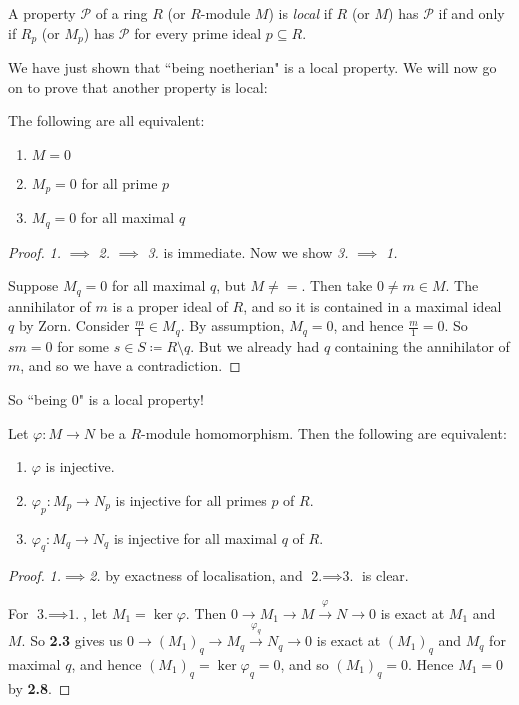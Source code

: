 \documentclass[10pt,a4paper]{article}
\begin{document}
\begin{definition}
  A property $\mathscr{P}$ of a ring $R$ (or $R$-module $M$) is \emph{local} if $R$ (or $M$) has $\mathscr{P}$ if and only if $R_p$ (or $M_p$) has $\mathscr{P}$ for every prime ideal $p \subseteq R$.
\end{definition}
We have just shown that ``being noetherian" is a local property. We will now go on to prove that another property is local:
\begin{lemma}
  The following are all equivalent:
  \begin{enumerate}
    \item $M=0$
    \item $M_p = 0$ for all prime $p$
    \item $M_q = 0$ for all maximal $q$
  \end{enumerate}
\end{lemma}
\begin{proof}
  \textit{1.} $\implies$ \textit{2.} $\implies$ \textit{3.} is immediate. Now we show \textit{3.} $\implies$ \textit{1.}

  Suppose $M_q = 0$ for all maximal $q$, but $M \neq =$. Then take $0 \neq m \in M$. The annihilator of $m$ is a proper ideal of $R$, and so it is contained in a maximal ideal $q$ by Zorn. Consider $\frac{m}{1} \in M_q$. By assumption, $M_q =0$, and hence $\frac{m}{1} = 0$. So $sm =0$ for some $s \in S\coloneqq R\setminus q$. But we already had $q$ containing the annihilator of $m$, and so we have a contradiction.
\end{proof}
So ``being 0" is a local property!
\begin{lemma}
  Let $\varphi:M \to N$ be a $R$-module homomorphism. Then the following are equivalent:
  \begin{enumerate}
    \item $\varphi$ is injective.
    \item $\varphi_p:M_p \to N_p$ is injective for all primes $p$ of $R$.
    \item $\varphi_q:M_q \to N_q$ is injective for all maximal $q$ of $R$.
  \end{enumerate}
\end{lemma}
\begin{proof}
  \textit{1.}$\implies$\textit{2.} by exactness of localisation, and $\textit{2.}\implies\textit{3.}$ is clear.

  For $\textit{3.}\implies\textit{1.}$, let $M_1 = \ker \varphi$. Then $0 \to M_1 \to M \xrightarrow{\varphi} N \to 0$ is exact at $M_1$ and $M$. So \textbf{2.3} gives us $0 \to (M_1)_q \to M_q \xrightarrow{\varphi_q} N_q \to 0$ is exact at $(M_1)_q$ and $M_q$ for maximal $q$, and hence $(M_1)_q = \ker \varphi_q = 0$, and so $(M_1)_q =0$. Hence $M_1 = 0$ by \textbf{2.8}.
\end{proof}
\end{document}
